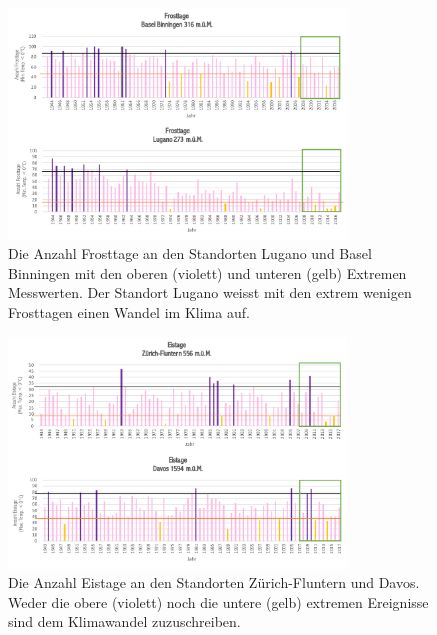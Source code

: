 \begin{refsection}
\begin{figure}
\centering
\includegraphics[width=0.8\textwidth]{extrem/Frosttage.pdf}
\caption{Die Anzahl Frosttage an den Standorten Lugano und Basel Binningen mit den oberen (violett) und unteren (gelb) Extremen Messwerten. Der Standort Lugano weisst mit den extrem wenigen Frosttagen einen Wandel im Klima auf.}
\label{Frosttage}
\end{figure}


\begin{figure}
\centering
\includegraphics[width=0.8\textwidth]{extrem/Eistage.pdf}
\caption{Die Anzahl Eistage an den Standorten Zürich-Fluntern und Davos. Weder die obere (violett) noch die untere (gelb) extremen Ereignisse sind dem Klimawandel zuzuschreiben.}
\label{Eistage}
\end{figure}



\end{refsection}
